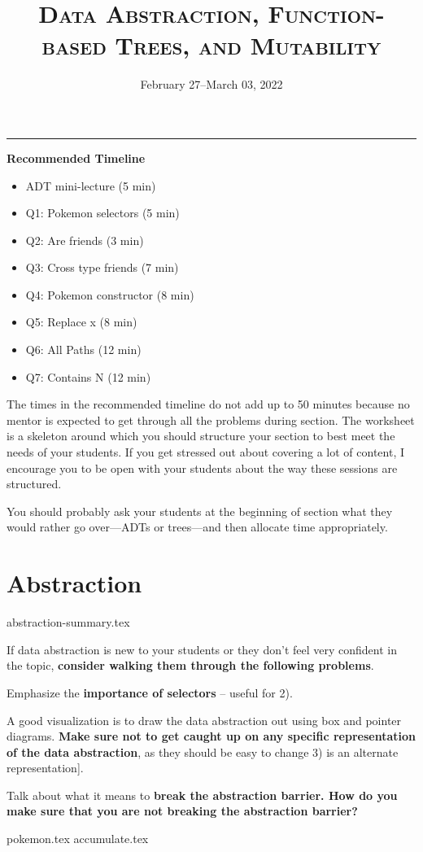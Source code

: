 \documentclass{exam}
\title{\textsc{Data Abstraction, Function-based Trees, and Mutability}}
\date{February 27--March 03, 2022}
\begin{document}
\maketitle
\rule{\textwidth}{0.15em}
\fontsize{12}{15}\selectfont


\begin{meta}
\textbf{Recommended Timeline}
\begin{itemize}
    \item ADT mini-lecture (5 min)
    \item Q1: Pokemon selectors (5 min)
    \item Q2: Are friends (3 min)
    \item Q3: Cross type friends (7 min)
    \item Q4: Pokemon constructor (8 min)
    \item Q5: Replace x (8 min)
    \item Q6: All Paths (12 min)
    \item Q7: Contains N (12 min)
\end{itemize}
The times in the recommended timeline do not add up to 50 minutes because no mentor
is expected to get through all the problems during section. The worksheet is a skeleton
around which you should structure your section to best meet the needs of your students.
If you get stressed out about covering a lot of content, I encourage you to be open with
your students about the way these sessions are structured.  

You should probably ask your students at the beginning of section what they would rather go
over---ADTs or trees---and then allocate time appropriately. 
\end{meta}


\section{Abstraction}
{abstraction-summary.tex}
\begin{meta}
    If data abstraction is new to your students or they don't feel very confident in the topic, \textbf{consider walking them through the following problems}.
    
    Emphasize the \textbf{importance of selectors} -- useful for 2).
    
    A good visualization is to draw the data abstraction out using box and pointer diagrams. \textbf{Make sure not to get caught up on any specific representation of the data abstraction}, as they should be easy to change 3) is an alternate representation].
    
    Talk about what it means to \textbf{break the abstraction barrier. How do you make sure that you are not breaking the abstraction barrier?}
    \end{meta}
\begin{questions}
    {pokemon.tex}
    {accumulate.tex}
\end{questions}
\end{document}
